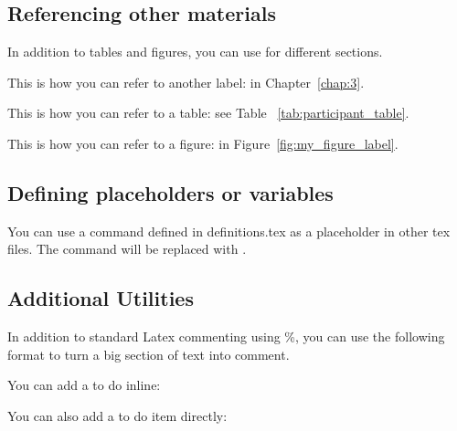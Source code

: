\subsection{Referencing other materials}

In addition to tables and figures, you can use \label{my_label_name} for different sections.

This is how you can refer to another label: in Chapter~\ref{chap:3}.

This is how you can refer to a table: see Table ~\ref{tab:participant_table}.

This is how you can refer to a figure: in Figure~\ref{fig:my_figure_label}.



\subsection{Defining placeholders or variables}

You can use a command defined in definitions.tex as a placeholder in other tex files. The command will be replaced with \MyPlaceHolder{}.



\subsection{Additional Utilities}

In addition to standard Latex commenting using \%, you can use the following format to turn a big section of text into comment.

You can add a to do inline:

You can also add a to do item directly:
